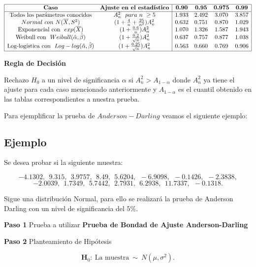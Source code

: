 \documentclass[
  a4paper,
  oneside,
  openany]{book}
\begin{document}
\[
\begin{array}{|c c| c c c c|}
\hline
\textbf{Caso} & \textbf{Ajuste en el estadístico} &\textbf{0.90} &\textbf{0.95} & \textbf{0.975} & \textbf{0.99} \\
\hline
\mbox{Todos los parámetros conocidos} & A_{n}^{2} \ \ para\ n\ \geq 5 & 1.933 & 2.492 & 3.070 & 3.857 \\
Normal\ con\ N(\overline{X},S^2) & (1+\frac{4}{n}+\frac{25}{n^2})A_{n}^{2} & 0.632 & 0.751 & 0.870 & 1.029 \\
\mbox{Exponencial con} \ \ exp(\overline{X}) & (1+\frac{0.6}{n})A_{n}^{2} & 1.070 & 1.326 & 1.587 & 1.943 \\
\mbox{Weibull con} \ \ Weibull(\hat{\alpha},\hat{\beta}) & (1+\frac{0.2}{\sqrt{n}})A_{n}^{2} & 0.637 & 0.757 & 0.877 & 1.038 \\
\mbox{Log-logística con} \ \ Log-log(\hat{\alpha},\hat{\beta}) & (1+\frac{0.25}{\sqrt{n}})A_{n}^{2} & 0.563 & 0.660 & 0.769 & 0.906 \\
\hline
\end{array}
\]

\textbf{Regla de Decisión}

Rechazo \(H_0\) a un nivel de significancia \(\alpha\) si \(A_{n}^2> A_{1-\alpha}\) donde \(A_{n}^{2}\) ya tiene el ajuste para cada caso mencionado anteriormente y \(A_{1-\alpha}\) es el cuantil obtenido en las tablas correspondientes a nuestra prueba.

Para ejemplificar la prueba de \(Anderson-Darling\) veamos el siguiente ejemplo:

\hypertarget{ejemplo-15}{%
\subsection{Ejemplo}\label{ejemplo-15}}

Se desea probar si la siguiente muestra:

\[-4.1302,\ \ 9.315,\ \ 3.9757,\ \ 8.49,\ \ 5.6204,\ \ -6.9098,\ \ -0.1426,\ \ -2.3838,\]
\[-2.0039,\ \ 1.7349,\ \ 5.7442,\ \ 2.7931,\ \ 6.2938,\ \ 11.7337,\ \ -0.1318.\]

Sigue una distribución Normal, para ello se realizará la prueba de Anderson Darling con un nivel de significancia del \(5\%\).

\textbf{Paso 1} Prueba a utilizar \textbf{Prueba de Bondad de Ajuste Anderson-Darling}

\textbf{Paso 2} Planteamiento de Hipótesis

\[\textbf{H}_0: \ \mbox{La muestra} \ \sim \  N(\mu,\sigma^2).\]
\end{document}
